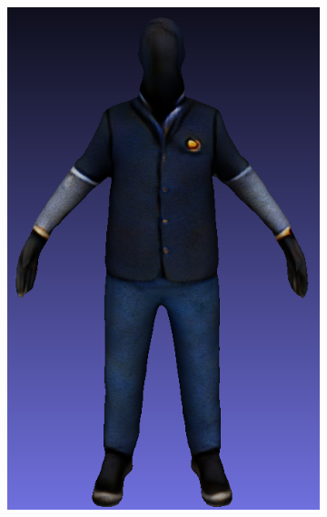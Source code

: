 \begin{figure}[ht]
\begin{subfigure}[b]{0.172\textwidth}
        \includegraphics[width=\textwidth]{etc/bias/bias_poor_genie_3.png}
        \caption{}
    \end{subfigure}
    \begin{subfigure}[b]{0.175\textwidth}
        \centering

\end{subfigure}
\end{figure}
